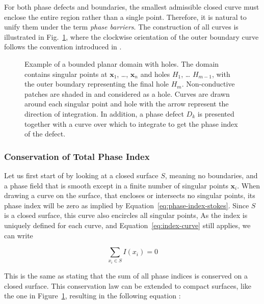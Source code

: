 \documentclass[twocolumn]{article}
\begin{document}
For both phase defects and boundaries,
the smallest admissible closed curve must enclose the entire region
rather than a single point.
Therefore, it is natural to unify them under the term \emph{phase barriers}.
The construction of all curves is illustrated in Fig.~\ref{fig:index_calculation},
where the clockwise orientation of the outer boundary curve
follows the convention introduced in \textcite{davidsen2004topological}.

\begin{figure}[ht]
  \centering
  \caption{Example of a bounded planar domain with holes. The domain
    contains singular points at \(\pmb{x}_1\), \ldots, \(\pmb{x}_n\) and
    holes \(H_1\), \ldots{} \(H_{m-1}\), with the outer boundary
    representing the final hole \(H_m\).
    Non-conductive patches are shaded in and considered as a hole.
    Curves are drawn around each singular point and hole
    with the arrow represent the direction of integration.
    In addition, a phase defect $D_k$ is presented
    together with a curve over which to integrate to get the phase index of the defect.
  }
  \label{fig:index_calculation}
\end{figure}

\subsubsection{Conservation of Total Phase Index}

Let us first start of by looking at a closed surface $S$, meaning no boundaries,
and a phase field that is smooth except in a finite number of singular points $\bm{x}_i$.
When drawing a curve on the surface,
that encloses or intersects no singular points,
its phase index will be zero as implied by Equation~\ref{eq:phase-index-stokes}.
Since \(S\) is a closed surface, this curve also encircles all singular points,
As the index is uniquely defined for each curve,
and Equation~\ref{eq:index-curve} still applies,
we can write

\begin{equation}
  \sum_{x_i \in S} I(x_i) = 0
  \label{eq:index-theorem}
\end{equation}

\noindent This is the same as stating that the sum of all phase indices is
conserved on a closed surface.
This conservation law can be extended to compact surfaces, like the one in Figure~\ref{fig:index_calculation},
resulting in the following equation \autocite{herlin2012reconstruction, davidsen2004topological}:
\end{document}
